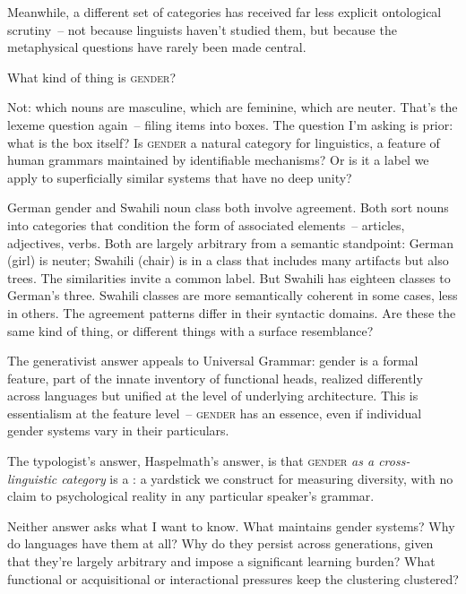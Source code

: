 Meanwhile, a different set of categories has received far less explicit ontological scrutiny~-- not because linguists haven't studied them, but because the metaphysical questions have rarely been made central.

What kind of thing is \textsc{gender}?

Not: which nouns are masculine, which are feminine, which are neuter. That's the lexeme question again~-- filing items into boxes. The question I'm asking is prior: what is the box itself? Is \textsc{gender} a natural category for linguistics, a feature of human grammars maintained by identifiable mechanisms? Or is it a label we apply to superficially similar systems that have no deep unity?

German gender and Swahili noun class both involve agreement. Both sort nouns into categories that condition the form of associated elements~-- articles, adjectives, verbs. Both are largely arbitrary from a semantic standpoint: German  (girl) is neuter; Swahili  (chair) is in a class that includes many artifacts but also trees. The similarities invite a common label. But Swahili has eighteen classes to German's three. Swahili classes are more semantically coherent in some cases, less in others. The agreement patterns differ in their syntactic domains. Are these the same kind of thing, or different things with a surface resemblance?

The generativist answer appeals to Universal Grammar: gender is a formal feature, part of the innate inventory of functional heads, realized differently across languages but unified at the level of underlying architecture. This is essentialism at the feature level~-- \textsc{gender} has an essence, even if individual gender systems vary in their particulars.

The typologist's answer, Haspelmath's answer, is that \textsc{gender} \emph{as a cross-linguistic category} is a : a yardstick we construct for measuring diversity, with no claim to psychological reality in any particular speaker's grammar.

Neither answer asks what I want to know. What maintains gender systems? Why do languages have them at all? Why do they persist across generations, given that they're largely arbitrary and impose a significant learning burden? What functional or acquisitional or interactional pressures keep the clustering clustered?

